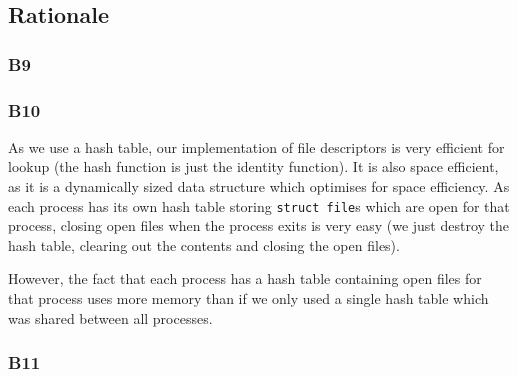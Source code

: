 \documentclass[a4wide, 11pt]{article}
\newcommand{\tx}{\texttt}
\begin{document}
\subsection{Rationale}
\subsubsection{B9}

\subsubsection{B10}

As we use a hash table, our implementation of file descriptors is very efficient for lookup (the hash function is just the identity function). It is also space efficient, as it is a dynamically sized data structure which optimises for space efficiency. As each process has its own hash table storing \tx{struct file}s which are open for that process, closing open files when the process exits is very easy (we just destroy the hash table, clearing out the contents and closing the open files).

However, the fact that each process has a hash table containing open files for that process uses more memory than if we only used a single hash table which was shared between all processes.

\subsubsection{B11}
\end{document}
